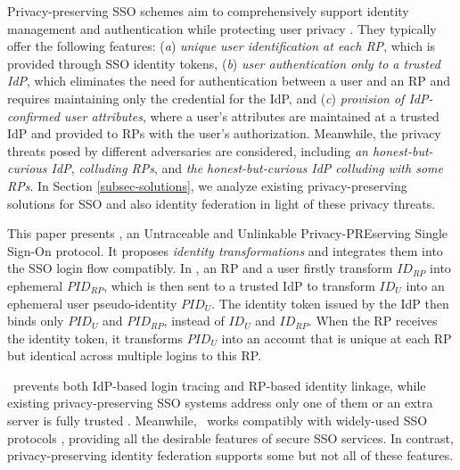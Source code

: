 Privacy-preserving SSO schemes aim to comprehensively support identity management and authentication while protecting user privacy \cite{maler2008venn, NIST2017draft, BrowserID, SPRESSO}.
They typically offer the following features:
(\emph{a}) \emph{unique user identification at each RP}, which is provided through SSO identity tokens,
(\emph{b}) \emph{user authentication only to a trusted IdP},
which eliminates the need for authentication between a user and an RP and requires maintaining only the credential for the IdP,
and (\emph{c}) \emph{provision of IdP-confirmed user attributes},
 where a user's attributes are maintained at a trusted IdP and provided to RPs with the user's authorization.
Meanwhile, the privacy threats posed by different adversaries are considered, including \emph{an honest-but-curious IdP}, \emph{colluding RPs}, and \emph{the honest-but-curious IdP colluding with some RPs}.
In Section \ref{subsec-solutions}, we analyze existing privacy-preserving solutions for SSO and also identity federation in light of these privacy threats.


This paper presents \usso, an Untraceable and Unlinkable Privacy-PREserving Single Sign-On protocol.
It proposes {\em identity transformations} and integrates them into the SSO login flow compatibly.
In \usso, an RP and a user firstly transform $ID_{RP}$ into ephemeral $PID_{RP}$, which is then sent to a trusted IdP to transform $ID_U$ into an ephemeral user pseudo-identity $PID_U$.
The identity token issued by the IdP then binds only $PID_U$ and $PID_{RP}$, instead of $ID_U$ and $ID_{RP}$. When the RP receives the identity token, %
 it transforms $PID_U$ into an account that is unique at each RP but identical across multiple logins to this RP.


\usso\ prevents %
 both IdP-based login tracing and RP-based identity linkage, while existing privacy-preserving SSO systems address only one of them \cite{BrowserID, SPRESSO, NIST2017draft, FirefoxAccount,save-flow} or an extra server is fully trusted \cite{miso}.
Meanwhile, \usso\ works compatibly with widely-used SSO protocols \cite{OpenIDConnect, rfc6749, SAML, NIST2017draft}, providing all the desirable features of secure SSO services.
In contrast, privacy-preserving identity federation \cite{PseudoID, ELPASSO, UnlimitID, Opaak, uprov, hyperledge-idemix} supports some but not all of these features.


